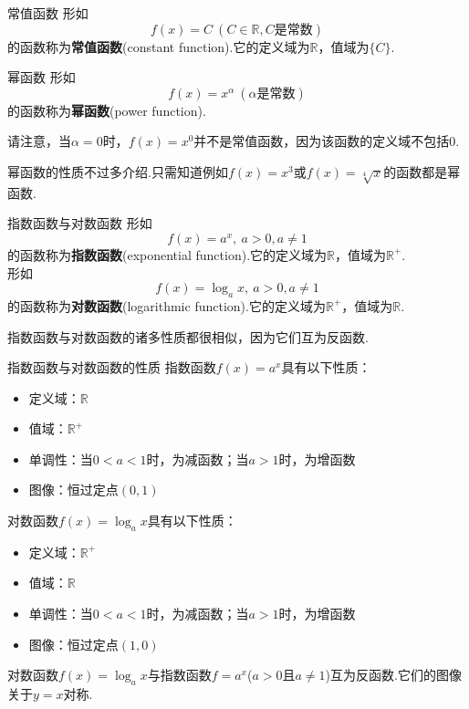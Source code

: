 \documentclass[lang=cn, zihao=5]{elegantbook}
\begin{document}
\begin{definition}{常值函数}
    形如$$f(x)=C \ (C \in \mathbb{R}, C\textit{是常数})$$
    的函数称为\textbf{常值函数}(constant function).它的定义域为$\mathbb{R}$，值域为$\{ C \}$.
\end{definition}

\begin{definition}{幂函数}
    形如$$f(x)=x^{\alpha} \ (\alpha \text{是常数})$$
    的函数称为\textbf{幂函数}(power function).
\end{definition}
\begin{remark}
	请注意，当$\alpha =0$时，$f(x)=x^0$并不是常值函数，因为该函数的定义域不包括$0$.
\end{remark}

幂函数的性质不过多介绍.只需知道例如$f(x)=x^3$或$f(x)=\sqrt[4]{x}$的函数都是幂函数.

\begin{definition}{指数函数与对数函数}
	形如$$f(x)=a^x, \ a>0 , a\neq 1$$
    的函数称为\textbf{指数函数}(exponential function).它的定义域为$\mathbb{R}$，值域为$\mathbb{R}^{+}$. \\
    形如$$f(x)=\log_{a}{x}, \ a>0,a \neq 1$$
    的函数称为\textbf{对数函数}(logarithmic function).它的定义域为$\mathbb{R}^{+}$，值域为$\mathbb{R}$.
\end{definition}

指数函数与对数函数的诸多性质都很相似，因为它们互为反函数.

\begin{proposition}{指数函数与对数函数的性质}
    指数函数$f(x)=a^x$具有以下性质：
    \begin{itemize}
        \item 定义域：$\mathbb{R}$
        \item 值域：$\mathbb{R}^+$
        \item 单调性：当$0<a<1$时，为减函数；当$a>1$时，为增函数
        \item 图像：恒过定点$(0,1)$
    \end{itemize}
    对数函数$f(x)=\log_{a}{x}$具有以下性质：
    \begin{itemize}
        \item 定义域：$\mathbb{R}^{+}$
        \item 值域：$\mathbb{R}$
        \item 单调性：当$0<a<1$时，为减函数；当$a>1$时，为增函数
        \item 图像：恒过定点$(1,0)$
    \end{itemize}
    对数函数$f(x)=\log_{a}{x}$与指数函数$f=a^{x}$($a>0$且$a \neq 1$)互为反函数.它们的图像关于$y=x$对称.
\end{proposition}
\end{document}
